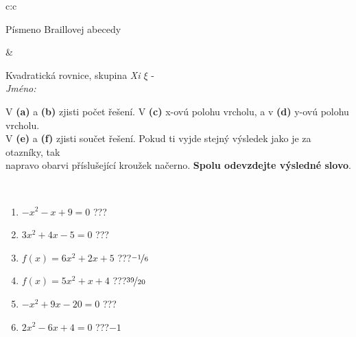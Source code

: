 \documentclass[10pt]{report}
\begin{document}
\begin{tabular}{c:c}
\begin{minipage}[c][104.5mm][t]{0.5\linewidth}
\begin{center}
\begin{minipage}{0.20\linewidth}
\begin{center}
{\small Písmeno Braillovej abecedy}
\end{center}
\end{minipage}
\end{center}
\end{minipage}
&
\begin{minipage}[c][104.5mm][t]{0.5\linewidth}
\begin{center}
\vspace{7mm}
{\huge Kvadratická rovnice, skupina \textit{Xi $\xi$} -}\\[5mm]
\textit{Jméno:}\phantom{xxxxxxxxxxxxxxxxxxxxxxxxxxxxxxxxxxxxxxxxxxxxxxxxxxxxxxxxxxxxxxxxx}\\[5mm]
\begin{minipage}{0.95\linewidth}
\begin{center}
V \textbf{(a)} a \textbf{(b)} zjisti počet řešení. V \textbf{(c)} x-ovú polohu vrcholu, a v \textbf{(d)} y-ovú polohu vrcholu.\\V \textbf{(e)} a \textbf{(f)} zjisti součet řešení. Pokud ti vyjde stejný výsledek jako je za otazníky, tak\\napravo obarvi příslušející kroužek načerno. \textbf{Spolu odevzdejte výsledné slovo}.
\end{center}
\end{minipage}
\\[1mm]
\begin{minipage}{0.79\linewidth}
\begin{center}
\begin{varwidth}{\linewidth}
\begin{enumerate}
\Large
\item $-x^2-x+9=0$\quad \dotfill\; ???\;\dotfill {}
\item $3x^2+4x-5=0$\quad \dotfill\; ???\;\dotfill {}
\item $f(x)=6x^2+2x+5$\quad \dotfill\; ???\;\dotfill \quad $\nicefrac{-1}{6}$
\item $f(x)=5x^2+x+4$\quad \dotfill\; ???\;\dotfill \quad $\nicefrac{39}{20}$
\item $-x^2+9x-20=0$\quad \dotfill\; ???\;\dotfill {}
\item $2x^2-6x+4=0$\quad \dotfill\; ???\;\dotfill \quad $-1$
\end{enumerate}
\end{varwidth}
\end{center}
\end{minipage}
\begin{minipage}{0.20\linewidth}
\begin{center}

\end{center}
\end{minipage}
\end{center}
\end{minipage}
\end{tabular}
\end{document}
